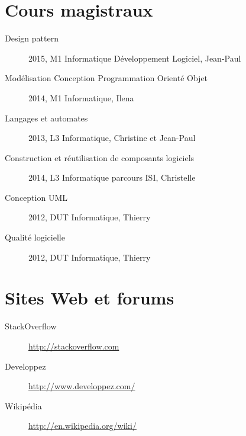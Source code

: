 \section{Cours magistraux}
\begin{description}
	\item[Design pattern] 2015, M1 Informatique Développement Logiciel, Jean-Paul 
	\item[Modélisation Conception Programmation Orienté Objet] 2014, M1 Informatique, Ilena 
	\item[Langages et automates] 2013, L3 Informatique, Christine  et Jean-Paul 
	\item[Construction et réutilisation de composants logiciels] 2014, L3 Informatique parcours ISI, Christelle 
	\item[Conception UML] 2012, DUT Informatique, Thierry 
	\item[Qualité logicielle] 2012, DUT Informatique, Thierry 
\end{description}
\section{Sites Web et forums}
	\begin{description}
		\item[StackOverflow] \url{http://stackoverflow.com}
		\item[Developpez] \url{http://www.developpez.com/}
		\item[Wikipédia] \url{http://en.wikipedia.org/wiki/}
	\end{description}

